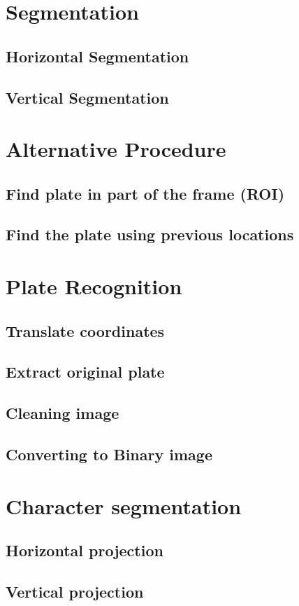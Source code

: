 \documentclass{standalone}
\begin{document}
\section{Segmentation}
\subsection{Horizontal Segmentation}
\subsection{Vertical Segmentation}

\section{Alternative Procedure}
\subsection{Find plate in part of the frame (ROI)}
\subsection{Find the plate using previous locations}

\section{Plate Recognition}
\subsection{Translate coordinates}
\subsection{Extract original plate}
\subsection{Cleaning image}
\subsection{Converting to Binary image}

\section{Character segmentation}
\subsection{Horizontal projection}
\subsection{Vertical projection}
\end{document}
